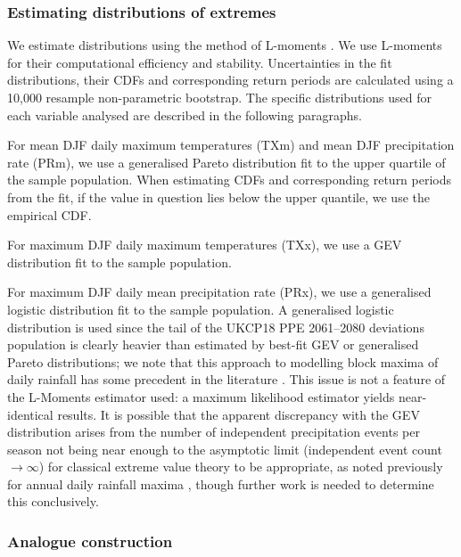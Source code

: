     \subsubsection{Estimating distributions of extremes}

      We estimate distributions using the method of L-moments \citep{hosking_estimation_1985,hosking_l-moments_1990,hosking_regional_1997}. We use L-moments for their computational efficiency and stability. Uncertainties in the fit distributions, their CDFs and corresponding return periods are calculated using a 10,000 resample non-parametric bootstrap. The specific distributions used for each variable analysed are described in the following paragraphs.
      
      For mean DJF daily maximum temperatures (TXm) and mean DJF precipitation rate (PRm), we use a generalised Pareto distribution \citep{coles_introduction_2001,hosking_parameter_1987} fit to the upper quartile of the sample population. When estimating CDFs and corresponding return periods from the fit, if the value in question lies below the upper quantile, we use the empirical CDF.

      For maximum DJF daily maximum temperatures (TXx), we use a GEV distribution fit to the sample population.

      For maximum DJF daily mean precipitation rate (PRx), we use a generalised logistic distribution \citep{hosking_l-moments_1990} fit to the sample population. A generalised logistic distribution is used since the tail of the UKCP18 PPE 2061--2080 deviations population is clearly heavier than estimated by best-fit GEV or generalised Pareto distributions; we note that this approach to modelling block maxima of daily rainfall has some precedent in the literature \citep{kysely_probability_2007,wan_zin_best_2009}. This issue is not a feature of the L-Moments estimator used: a maximum likelihood estimator yields near-identical results. It is possible that the apparent discrepancy with the GEV distribution arises from the number of independent precipitation events per season not being near enough to the asymptotic limit (independent event count $\rightarrow \infty$) for classical extreme value theory to be appropriate, as noted previously for annual daily rainfall maxima \citep{marani_metastatistical_2015}, though further work is needed to determine this conclusively.

    \cleardoublepage
    \subsubsection{Analogue construction}

